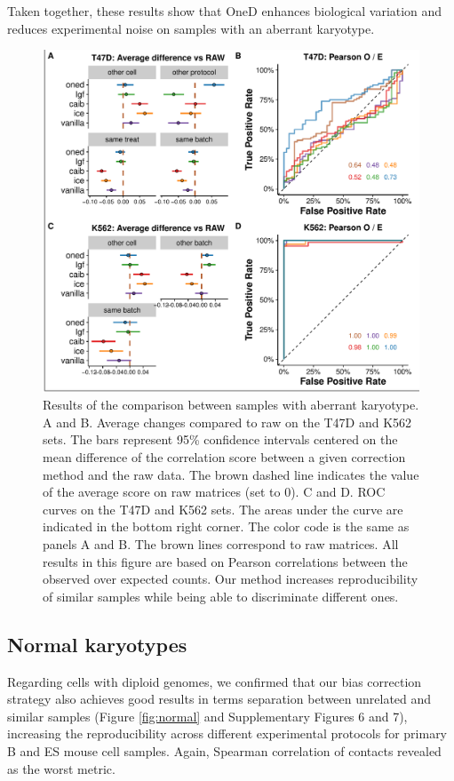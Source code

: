 \documentclass{bioinfo}
\begin{document}
Taken together, these results show that OneD enhances biological variation
and reduces experimental noise on samples with an aberrant karyotype.


\begin{figure}
\centerline{\includegraphics[width=.50\textwidth]{img/correlation_aberrant_figure3.pdf}}
\caption{
Results of the comparison between samples with aberrant karyotype.  A and
B. Average changes compared to raw on the T47D and K562 sets.  The bars
represent 95\% confidence intervals centered on the mean difference of the
correlation score between a given correction method and the raw data. The
brown dashed line indicates the value of the average score on raw matrices
(set to 0). C and D. ROC curves on the T47D and K562 sets. The areas under
the curve are indicated in the bottom right corner. The color code is the
same as panels A and B. The brown lines correspond to raw matrices.  All
results in this figure are based on Pearson correlations between the
observed over expected counts.  Our method increases reproducibility of
similar samples while being able to discriminate different ones.}
\label{fig:aberrant}
\end{figure}


\subsection{Normal karyotypes}

Regarding cells with diploid genomes, we confirmed that our bias
correction strategy also achieves good results in terms separation between
unrelated and similar samples (Figure \ref{fig:normal} and Supplementary
Figures 6 and 7), increasing the reproducibility across different
experimental protocols for primary B and ES mouse cell samples. Again,
Spearman correlation of contacts revealed as the worst metric.
\end{document}
